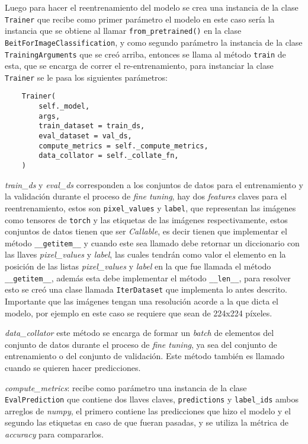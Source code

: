 Luego para hacer el reentrenamiento del modelo se crea una instancia de la clase \texttt{Trainer} que recibe como primer parámetro el modelo en este caso sería la instancia que se obtiene al llamar \texttt{from\_pretrained()} en la clase \texttt{BeitForImageClassification}, y como segundo parámetro la instancia de la clase \texttt{TrainingArguments} que se creó arriba, entonces se llama al método \texttt{train} de esta, que se encarga de correr el re-entrenamiento, para instanciar la clase \texttt{Trainer} se le pasa los siguientes parámetros:

\begin{verbatim}
    Trainer(
        self._model,
        args,
        train_dataset = train_ds,
        eval_dataset = val_ds,
        compute_metrics = self._compute_metrics,
        data_collator = self._collate_fn,
    )
\end{verbatim}

\textit{train\_ds} y \textit{eval\_ds} corresponden a los conjuntos de datos para el entrenamiento y la validación durante el proceso de \textit{fine tuning}, hay dos \textit{features} claves para el reentrenamiento, estos son \texttt{pixel\_values} y \texttt{label}, que representan las imágenes como tensores de \texttt{torch} y las etiquetas de las imágenes respectivamente, estos conjuntos de datos tienen que ser \textit{Callable}, es decir tienen que implementar el método \texttt{\_\_getitem\_\_} y cuando este sea llamado debe retornar un diccionario con las llaves \textit{pixel\_values} y \textit{label}, las cuales tendrán como valor el elemento en la posición de las listas \textit{pixel\_values} y \textit{label} en la que fue llamada el método \texttt{\_\_getitem\_\_}, además esta debe implementar el método \texttt{\_\_len\_\_}, para resolver esto se creó una clase llamada \texttt{IterDataset} que implementa lo antes descrito. Importante que las imágenes tengan una resolución acorde a la que dicta el modelo, por ejemplo en este caso se requiere que sean de 224x224 píxeles.

\textit{data\_collator} este método se encarga de formar un \textit{batch} de elementos del conjunto de datos durante el proceso de \textit{fine tuning}, ya sea del conjunto de entrenamiento o del conjunto de validación. Este método también es llamado cuando se quieren hacer predicciones.

\textit{compute\_metrics}: recibe como parámetro una instancia de la clase \texttt{EvalPrediction} que contiene dos llaves claves, \texttt{predictions} y \texttt{label\_ids} ambos arreglos de \textit{numpy}, el primero contiene las predicciones que hizo el modelo y el segundo las etiquetas en caso de que fueran pasadas, y se utiliza la métrica de \textit{accuracy} para compararlos.

